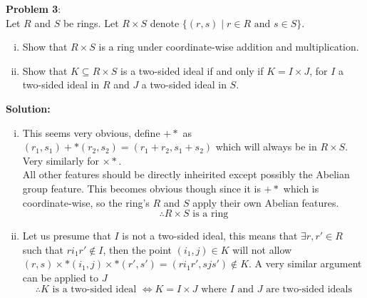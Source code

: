 \documentclass[11pt]{article}
\newcommand{\prob}[3]{\begin{flushleft}
        \textbf{Problem #1}: \\
        #2 
		\textbf{Solution:} 
		#3

\end{flushleft}}
\begin{document}
\prob{3}{
    Let $R$ and $S$ be rings. Let $R \times S$ denote $\{(r,s) \mid r \in R \text{ and } s \in S \}$.
    \begin{enumerate}[(i)]
        \item Show that $R \times S$ is a ring under coordinate-wise addition and multiplication.
        \item Show that $K \subseteq R \times S$ is a two-sided ideal if and only if $K = I \times J$, for $I$ a two-sided ideal in $R$ and $J$ a two-sided ideal in $S$.
    \end{enumerate}
}{
    \begin{enumerate}[(i)]
        \item This seems very obvious, define $+*$ as $(r_1, s_1) +* (r_2, s_2) = (r_1 + r_2, s_1 + s_2)$ which will always be in $R \times S$. Very similarly for $\times*$. \\
              All other features should be directly inheirited except possibly the Abelian group feature. This becomes obvious though since it is $+*$ which is coordinate-wise, so the ring's $R$ and $S$ apply their own Abelian features.
              $$\therefore R\times S \text{ is a ring}$$

        \item Let us presume that $I$ is not a two-sided ideal, this means that $\exists r,r' \in R$ such that $ri_1r' \notin I$, then the point $(i_1, j) \in K$ will not allow $(r, s) \times* (i_1, j) \times* (r', s') = (ri_1r', sjs') \notin K$.
              A very similar argument can be applied to $J$
              $$\therefore K \text{ is a two-sided ideal $\iff K = I \times J$ where $I$ and $J$ are two-sided ideals}$$
    \end{enumerate}
}
\end{document}
